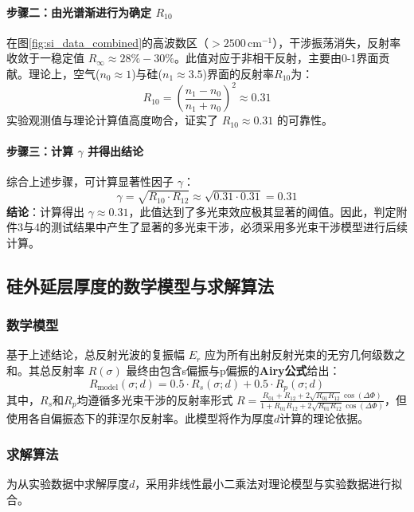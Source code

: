 \documentclass[withoutpreface,bwprint]{cumcmthesis} %
\begin{document}
\paragraph{步骤二：由光谱渐进行为确定 $R_{10}$}
在图\ref{fig:si_data_combined}的高波数区（$>2500 \, \text{cm}^{-1}$），干涉振荡消失，反射率收敛于一稳定值 $R_\infty \approx 28\%-30\%$。此值对应于非相干反射，主要由0-1界面贡献。理论上，空气($n_0 \approx 1$)与硅($n_1 \approx 3.5$)界面的反射率$R_{10}$为：
\begin{equation}
    R_{10} = \left( \frac{n_1 - n_0}{n_1 + n_0} \right)^2 \approx 0.31
\end{equation}
实验观测值与理论计算值高度吻合，证实了 $R_{10} \approx 0.31$ 的可靠性。

\paragraph{步骤三：计算 $\gamma$ 并得出结论}
综合上述步骤，可计算显著性因子 $\gamma$：
\begin{equation}
    \gamma = \sqrt{R_{10} \cdot R_{12}} \approx \sqrt{0.31 \cdot 0.31} = 0.31
\end{equation}
\textbf{结论}：计算得出 $\gamma \approx 0.31$，此值达到了多光束效应极其显著的阈值。因此，判定附件3与4的测试结果中产生了显著的多光束干涉，必须采用多光束干涉模型进行后续计算。
\subsection{硅外延层厚度的数学模型与求解算法}

\subsubsection{数学模型}
基于上述结论，总反射光波的复振幅 $E_r$ 应为所有出射反射光束的无穷几何级数之和。其总反射率 $R(\sigma)$ 最终由包含s偏振与p偏振的\textbf{Airy公式}\cite{Airy}给出：
\begin{equation}
    R_{\text{model}}(\sigma; d) = 0.5 \cdot R_s(\sigma; d) + 0.5 \cdot R_p(\sigma; d)
\end{equation}
其中，$R_s$和$R_p$均遵循多光束干涉的反射率形式 $R = \frac{R_{01}+R_{12}+2\sqrt{R_{01}R_{12}}\cos(\Delta\Phi)}{1+R_{01}R_{12}+2\sqrt{R_{01}R_{12}}\cos(\Delta\Phi)}$，但使用各自偏振态下的菲涅尔反射率。此模型将作为厚度$d$计算的理论依据。

\subsubsection{求解算法}
为从实验数据中求解厚度$d$，采用非线性最小二乘法对理论模型与实验数据进行拟合。
\end{document}
